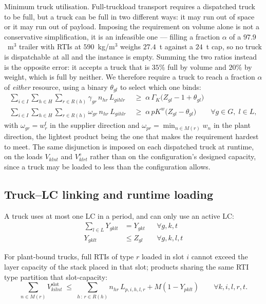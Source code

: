{\color{blue}
Minimum truck utilisation. Full-truckload transport requires a
dispatched truck to be full, but a truck can be full in two different
ways: it may run out of space or it may run out of payload. Imposing
the requirement on volume alone is not a conservative simplification,
it is an infeasible one --- filling a fraction $\alpha$ of a
$97.9$~m$^{3}$ trailer with RTIs at $590$~kg/m$^{3}$ weighs $27.4$~t
against a $24$~t cap, so no truck is dispatchable at all and the
instance is empty. Summing the two ratios instead is the opposite
error: it accepts a truck that is $35\%$ full by volume and $20\%$ by
weight, which is full by neither. We therefore require a truck to
reach a fraction $\alpha$ of \emph{either} resource, using a binary
$\theta_{gl}$ to select which one binds:
\begin{align}
\sum_{i\in I}\sum_{h\in H}\sum_{r\in R(h)}
    \gamma_{gr}\,n_{hr}\,L_{gihlr}
&\;\ge\;\alpha\,\Gamma_K\bigl(Z_{gl}-1+\theta_{gl}\bigr)
\label{sb:eq:util}\\
\sum_{i\in I}\sum_{h\in H}\sum_{r\in R(h)}
    \omega_{gr}\,n_{hr}\,L_{gihlr}
&\;\ge\;\alpha\,pK^{w}\bigl(Z_{gl}-\theta_{gl}\bigr)
\qquad \forall g\in G,\; l\in L,
\label{sb:eq:utilw}
\end{align}
with $\omega_{gr}=w^{\mathrm{f}}_{r}$ in the supplier direction and
$\omega_{pr}=\min_{n\in M(r)}w_{n}$ in the plant direction, the
lightest product being the one that makes the requirement hardest to
meet. The same disjunction is imposed on each dispatched truck at
runtime, on the loads $V_{klnt}$ and $V^{\mathrm{e}}_{klrt}$ rather
than on the configuration's designed capacity, since a truck may be
loaded to less than the configuration allows.
}

\subsection*{Truck--LC linking and runtime loading}

A truck uses at most one LC in a period, and can only use an active
LC:
\begin{align}
\sum_{l\in L} Y_{gklt}&=Y_{gkt}
    &&\forall g,k,t
    \label{sb:eq:one-lc}\\
Y_{gklt}&\le Z_{gl}
    &&\forall g,k,l,t
    \label{sb:eq:lc-active}
\end{align}

For plant-bound trucks, full RTIs of type $r$ loaded in slot $i$ cannot
exceed the layer capacity of the stack placed in that slot; products
sharing the same RTI type partition that slot-capacity:
\begin{equation}
\sum_{n\in M(r)} V^{\mathrm{slot}}_{kilnt}
\;\le\;\sum_{h\,:\,r\in R(h)} n_{hr}\,L_{p,i,h,l,r}
    + M(1-Y_{pklt})
\qquad \forall k,i,l,r,t.
\label{sb:eq:slot-cap}
\end{equation}

